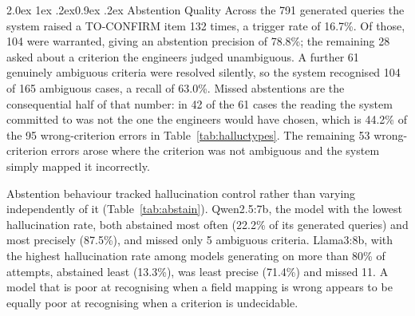 \documentclass[10pt]{article}
\makeatletter
\renewcommand\subsection{\@startsection{subsection}{2}{\z@}%
  {2.0ex \@plus 1ex \@minus .2ex}{0.9ex \@plus .2ex}%
  {\normalfont\normalsize\bfseries}}
\makeatother
\begin{document}
\subsection{Abstention Quality}\label{sec:abst}
Across the 791 generated queries the system raised a TO-CONFIRM item 132 times,
a trigger rate of 16.7\%. Of those, 104 were warranted, giving an abstention
precision of 78.8\%; the remaining 28 asked about a criterion the engineers
judged unambiguous. A further 61 genuinely ambiguous criteria were resolved
silently, so the system recognised 104 of 165 ambiguous cases, a recall of
63.0\%. Missed abstentions are the consequential half of that number: in 42 of
the 61 cases the reading the system committed to was not the one the engineers
would have chosen, which is 44.2\% of the 95 wrong-criterion errors in
Table~\ref{tab:halluctypes}. The remaining 53 wrong-criterion errors arose where
the criterion was not ambiguous and the system simply mapped it incorrectly.

Abstention behaviour tracked hallucination control rather than varying
independently of it (Table~\ref{tab:abstain}). Qwen2.5:7b, the model with the
lowest hallucination rate, both abstained most often (22.2\% of its generated
queries) and most precisely (87.5\%), and missed only 5 ambiguous criteria.
Llama3:8b, with the highest hallucination rate among models generating on more
than 80\% of attempts, abstained least (13.3\%), was least precise (71.4\%) and
missed 11. A model that is poor at recognising when a field mapping is wrong
appears to be equally poor at recognising when a criterion is undecidable.
\end{document}

